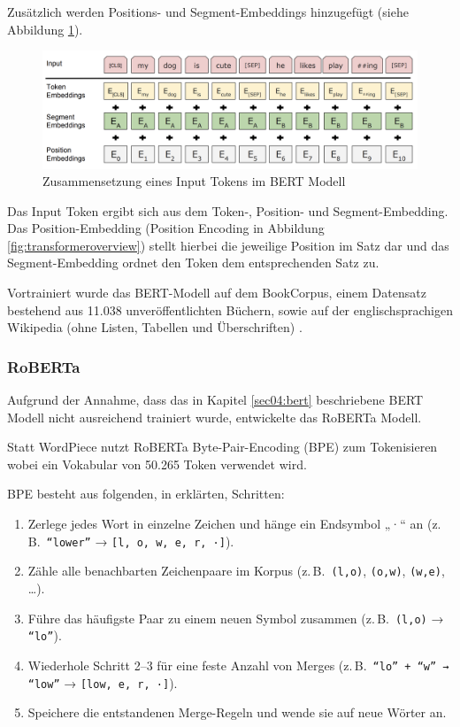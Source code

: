 Zusätzlich werden Positions- und Segment-Embeddings hinzugefügt (siehe Abbildung \ref{fig:bert_tokenizierung}).

\begin{figure}[htbp]
    \begin{center}
        \includegraphics[scale=0.4]{static/bert_tokenizierung.png}
        \caption{\label{fig:bert_tokenizierung} Zusammensetzung eines Input Tokens im BERT Modell \cite{devlin2019}}
    \end{center}
\end{figure}

Das Input Token ergibt sich aus dem Token-, Position- und Segment-Embedding. Das Position-Embedding (Position Encoding in Abbildung \ref{fig:transformeroverview}) 
stellt hierbei die jeweilige Position im Satz dar und das Segment-Embedding ordnet den Token dem entsprechenden Satz zu.

Vortrainiert wurde das BERT-Modell auf dem BookCorpus, einem Datensatz bestehend aus 11.038 unveröffentlichten Büchern, sowie auf der englischsprachigen Wikipedia 
(ohne Listen, Tabellen und Überschriften) \cite{DBLP:journals/corr/abs-1810-04805}.

\subsubsection{RoBERTa} \label{sec04:roberta}

Aufgrund der Annahme, dass das in Kapitel \ref{sec04:bert} beschriebene BERT Modell nicht ausreichend trainiert wurde, entwickelte 
\cite{DBLP:journals/corr/abs-1907-11692} das RoBERTa Modell.

Statt WordPiece nutzt RoBERTa Byte-Pair-Encoding (BPE) zum Tokenisieren wobei ein Vokabular von 50.265 Token verwendet wird.

BPE besteht aus folgenden, in \cite{sennrich2015} erklärten, Schritten:
\begin{enumerate}
  \item Zerlege jedes Wort in einzelne Zeichen und hänge ein Endsymbol „·“ an (z.\,B.\ \texttt{``lower''} → \texttt{[l, o, w, e, r, ·]}).
  \item Zähle alle benachbarten Zeichenpaare im Korpus (z.\,B.\ \texttt{(l,o)}, \texttt{(o,w)}, \texttt{(w,e)}, \dots).
  \item Führe das häufigste Paar zu einem neuen Symbol zusammen (z.\,B.\ \texttt{(l,o)} → \texttt{``lo''}).
  \item Wiederhole Schritt 2–3 für eine feste Anzahl von Merges (z.\,B.\ \texttt{``lo'' + ``w'' → ``low''} → \texttt{[low, e, r, ·]}).
  \item Speichere die entstandenen Merge-Regeln und wende sie auf neue Wörter an.
\end{enumerate}

